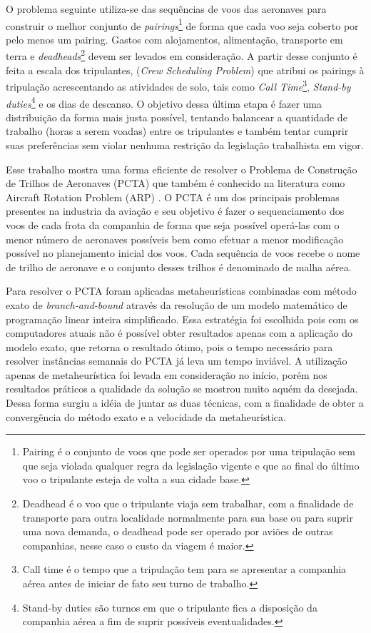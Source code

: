 O problema seguinte utiliza-se das sequências de voos das aeronaves para
construir o melhor conjunto de \textit{pairings}\footnote{Pairing é o conjunto de voos que
pode ser operados por uma tripulação sem que seja violada qualquer regra da
legislação vigente e que ao final do último voo o tripulante esteja de volta a
sua cidade base.} de forma que cada voo seja coberto por pelo menos um pairing.
Gastos com alojamentos, alimentação, transporte em terra e
\textit{deadheads}\footnote{Deadhead é o voo que o tripulante viaja sem
trabalhar, com a finalidade de transporte para outra localidade normalmente
para sua base ou para suprir uma nova demanda, o deadhead pode ser operado por
aviões de outras companhias, nesse caso o custo da viagem é maior.} devem ser
levados em consideração. A partir desse conjunto é feita a escala dos
tripulantes, (\textit{Crew Scheduling Problem}) que atribui os pairings à
tripulação acrescentando as atividades de solo, tais como \textit{Call
Time}\footnote{Call time é o tempo que a tripulação tem para se apresentar a
companhia aérea antes de iniciar de fato seu turno de trabalho.},
\textit{Stand-by duties}\footnote{Stand-by duties são turnos em que o
tripulante fica a disposição da companhia aérea a fim de suprir possíveis
eventualidades.} e os dias de descanso. O objetivo dessa última etapa é fazer
uma distribuição da forma mais justa possível, tentando balancear a quantidade
de trabalho (horas a serem voadas) entre os tripulantes e também tentar cumprir
suas preferências sem violar nenhuma restrição da legislação trabalhista em
vigor.
   

Esse trabalho mostra uma forma eficiente de resolver o Problema de Construção
de Trilhos de Aeronaves (PCTA) 
que também é conhecido na literatura como Aircraft Rotation
Problem (ARP) 
. O PCTA é um dos principais problemas presentes na industria da aviação e seu objetivo
é fazer o sequenciamento dos voos de cada frota da companhia de forma que seja
possível operá-las com o menor número de aeronaves possíveis \cite{abiliolivro}
bem como efetuar a menor modificação possível no planejamento inicial dos voos.
Cada sequência de voos recebe o nome de trilho de aeronave e o conjunto desses
trilhos é denominado de malha aérea.

Para resolver o PCTA foram aplicadas metaheurísticas combinadas com
método exato de \textit{branch-and-bound} através da
resolução de um modelo matemático de programação linear inteira simplificado.
Essa estratégia foi escolhida pois com os computadores atuais não é possível
obter resultados apenas com a aplicação do modelo exato, que retorna o resultado
ótimo, pois o tempo necessário para resolver instâncias semanais do PCTA já
leva um tempo inviável. A utilização apenas de metaheurística foi levada em
consideração no início, porém nos resultados práticos a qualidade da solução se
mostrou muito aquém da desejada. Dessa forma surgiu a idéia de juntar as duas
técnicas, com a finalidade de obter a convergência do método exato e a
velocidade da metaheurística.

